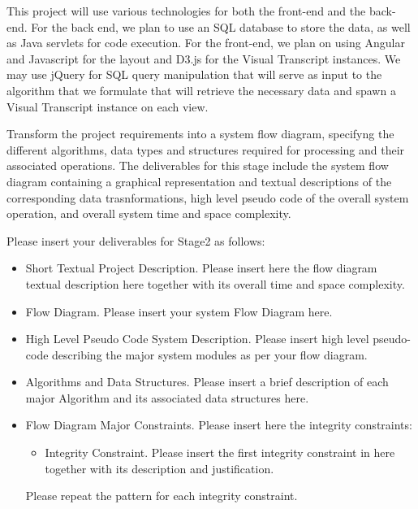 This project will use various technologies for both the front-end and the back-end. For the back end, we plan to use an SQL database to store the data, as well as Java servlets for code execution. For the front-end, we plan on using Angular and Javascript for the layout and D3.js for the Visual Transcript instances. We may use jQuery for SQL query manipulation that will serve as input to the algorithm that we formulate that will retrieve the necessary data and spawn a Visual Transcript instance on each view. 

\textnormal{
Transform the project requirements into a system flow diagram, specifyng the different algorithms, data types and structures required for processing and their associated operations.  
The deliverables for this stage include the system flow diagram containing a graphical representation and  textual descriptions of the corresponding data trasnformations, high level pseudo code of the overall system operation, and overall system time and space complexity.}


Please insert your deliverables for Stage2 as follows:
\begin{itemize} 
\item{  Short Textual Project Description. }
Please insert here the flow diagram textual description here together with its overall time and space complexity.
\item{ Flow Diagram. }
Please insert your system Flow Diagram here.
\item{ High Level Pseudo Code System Description. }
Please insert high level pseudo-code describing the major system modules as per your flow diagram.
\item{Algorithms and  Data Structures. }
Please insert a brief description of each major Algorithm and its associated data structures here.
\end{itemize}

\begin{itemize} 
\item{  Flow Diagram Major Constraints.}
Please insert here the integrity constraints:
\begin{itemize} 
\item{ Integrity Constraint. }
Please insert the first integrity constraint in here together with its description and justification. 
\end{itemize}
Please repeat the pattern for each integrity constraint.
\end{itemize}
